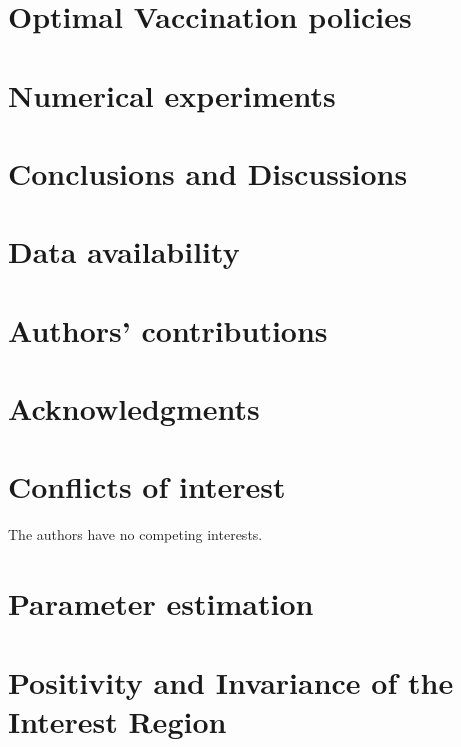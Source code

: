 \documentclass[3p, sort&compress]{elsarticle}
\begin{document}
    \section{Optimal Vaccination policies}
        \label{Sec:OptimalVaccinePolicies}
        
    \section{Numerical experiments}
        \label{Sec:NumericalExperiment}
        
    \section{Conclusions and Discussions}
        
    \section*{Data availability}
        
    \section*{Authors’ contributions}
        
    \section*{Acknowledgments}
        
    \section*{Conflicts of interest}
        The authors have no competing interests.
    
    
    \appendix
    \section{Parameter estimation}
        
    \section{Positivity and Invariance of the Interest Region}
        \label{apx:positivity_invariace}
        
\end{document}
